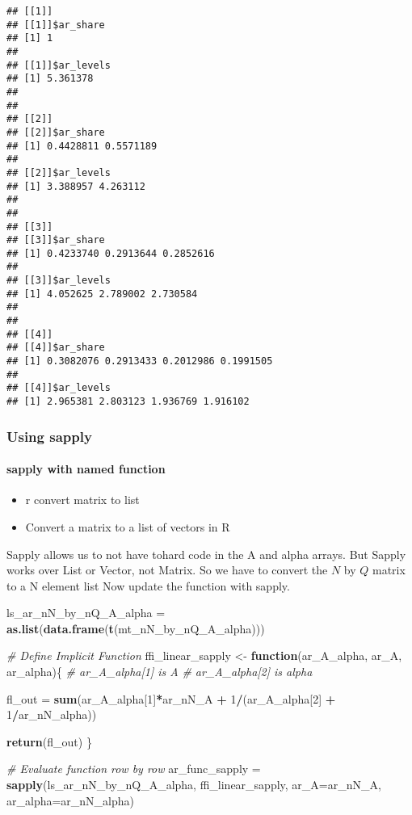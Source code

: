 \documentclass[
]{book}
\newenvironment{Shaded}{\begin{snugshade}}{\end{snugshade}}
\newcommand{\CommentTok}[1]{\textcolor[rgb]{0.56,0.35,0.01}{\textit{#1}}}
\newcommand{\ControlFlowTok}[1]{\textcolor[rgb]{0.13,0.29,0.53}{\textbf{#1}}}
\newcommand{\DataTypeTok}[1]{\textcolor[rgb]{0.13,0.29,0.53}{#1}}
\newcommand{\DecValTok}[1]{\textcolor[rgb]{0.00,0.00,0.81}{#1}}
\newcommand{\KeywordTok}[1]{\textcolor[rgb]{0.13,0.29,0.53}{\textbf{#1}}}
\newcommand{\NormalTok}[1]{#1}
\newcommand{\OperatorTok}[1]{\textcolor[rgb]{0.81,0.36,0.00}{\textbf{#1}}}
\newcommand{\StringTok}[1]{\textcolor[rgb]{0.31,0.60,0.02}{#1}}
\providecommand{\tightlist}{%
  \setlength{\itemsep}{0pt}\setlength{\parskip}{0pt}}
\begin{document}
\begin{verbatim}
## [[1]]
## [[1]]$ar_share
## [1] 1
## 
## [[1]]$ar_levels
## [1] 5.361378
## 
## 
## [[2]]
## [[2]]$ar_share
## [1] 0.4428811 0.5571189
## 
## [[2]]$ar_levels
## [1] 3.388957 4.263112
## 
## 
## [[3]]
## [[3]]$ar_share
## [1] 0.4233740 0.2913644 0.2852616
## 
## [[3]]$ar_levels
## [1] 4.052625 2.789002 2.730584
## 
## 
## [[4]]
## [[4]]$ar_share
## [1] 0.3082076 0.2913433 0.2012986 0.1991505
## 
## [[4]]$ar_levels
## [1] 2.965381 2.803123 1.936769 1.916102
\end{verbatim}

\hypertarget{using-sapply}{%
\subsubsection{Using sapply}\label{using-sapply}}

\hypertarget{sapply-with-named-function}{%
\paragraph{sapply with named function}\label{sapply-with-named-function}}

\begin{itemize}
\tightlist
\item
  r convert matrix to list
\item
  Convert a matrix to a list of vectors in R
\end{itemize}

Sapply allows us to not have tohard code in the A and alpha arrays. But Sapply works over List or Vector, not Matrix. So we have to convert the \(N\) by \(Q\) matrix to a N element list
Now update the function with sapply.

\begin{Shaded}
\begin{Highlighting}[]
\NormalTok{ls_ar_nN_by_nQ_A_alpha =}\StringTok{ }\KeywordTok{as.list}\NormalTok{(}\KeywordTok{data.frame}\NormalTok{(}\KeywordTok{t}\NormalTok{(mt_nN_by_nQ_A_alpha)))}

\CommentTok{# Define Implicit Function}
\NormalTok{ffi_linear_sapply <-}\StringTok{ }\ControlFlowTok{function}\NormalTok{(ar_A_alpha, ar_A, ar_alpha)\{}
  \CommentTok{# ar_A_alpha[1] is A}
  \CommentTok{# ar_A_alpha[2] is alpha}

\NormalTok{  fl_out =}\StringTok{ }\KeywordTok{sum}\NormalTok{(ar_A_alpha[}\DecValTok{1}\NormalTok{]}\OperatorTok{*}\NormalTok{ar_nN_A }\OperatorTok{+}\StringTok{ }\DecValTok{1}\OperatorTok{/}\NormalTok{(ar_A_alpha[}\DecValTok{2}\NormalTok{] }\OperatorTok{+}\StringTok{ }\DecValTok{1}\OperatorTok{/}\NormalTok{ar_nN_alpha))}

  \KeywordTok{return}\NormalTok{(fl_out)}
\NormalTok{\}}

\CommentTok{# Evaluate function row by row}
\NormalTok{ar_func_sapply =}\StringTok{ }\KeywordTok{sapply}\NormalTok{(ls_ar_nN_by_nQ_A_alpha, ffi_linear_sapply,}
                        \DataTypeTok{ar_A=}\NormalTok{ar_nN_A, }\DataTypeTok{ar_alpha=}\NormalTok{ar_nN_alpha)}
\end{Highlighting}
\end{Shaded}
\end{document}
